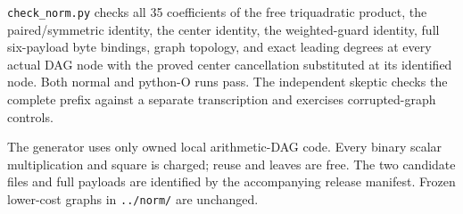 \texttt{check\_\allowbreak{}norm.py} checks all 35 coefficients of the free triquadratic product, the paired/\allowbreak{}symmetric identity, the center identity, the weighted-guard identity, full six-payload byte bindings, graph topology, and exact leading degrees at every actual DAG node with the proved center cancellation substituted at its identified node. Both normal and python-O runs pass. The independent skeptic checks the complete prefix against a separate transcription and exercises corrupted-graph controls.



The generator uses only owned local arithmetic-DAG code. Every binary scalar multiplication and square is charged; reuse and leaves are free. The two candidate files and full payloads are identified by the accompanying release manifest. Frozen lower-cost graphs in \texttt{../\allowbreak{}norm/\allowbreak{}} are unchanged.
